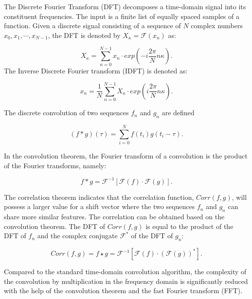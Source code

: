 \documentclass[letterpaper, 10 pt, conference]{ieeeconf}  %
\begin{document}
The Discrete Fourier Transform (DFT) decomposes a time-domain signal into its constituent frequencies. The input is a finite list of equally spaced samples of a function. Given a discrete signal consisting of a sequence of $N$ complex numbers $x_{0},x_{1},\cdots,x_{N-1}$, the DFT is denoted by $X_{\kappa} = \mathcal{F}({x_{n}})$ as:

\begin{equation}\label{equ21}
    X_{\kappa} = \sum_{n=0}^{N-1}x_{n}\cdot exp(-i\frac{2\pi}{N}n\kappa).
\end{equation}
The Inverse Discrete Fourier transform (IDFT) is denoted as:

\begin{equation}\label{equ22}
    x_{n} = \frac{1}{N}\sum_{n=0}^{N-1}X_{\kappa}\cdot exp(i\frac{2\pi}{N}n\kappa).
\end{equation}

The discrete convolution of two sequences $f_{n}$ and $g_{n}$  are defined

\begin{equation}\label{equ23}
    (f \ast g)(\tau)=\sum_{i=0}^{N}f(t_{i})g(t_{i}-\tau).
\end{equation}

In the convolution theorem, the Fourier transform of a convolution is the product of the Fourier transforms, namely:

\begin{equation}\label{equ24}
    f \ast g = \mathcal{F}^{-1} [\mathcal{F}(f) \cdot \mathcal{F}(g)].
\end{equation}
 
The correlation theorem indicates that the correlation function, $Corr(f,g)$, will possess a larger value for a shift vector where the two sequences $f_n$ and $g_n$ can share more similar features. The correlation can be obtained based on the convolution theorem. The DFT of $Corr(f,g)$ is equal to the product of the DFT of $f_{n}$ and the complex conjugate $\mathcal{F}^{*}$ of the DFT of $g_n$:

\begin{equation}\label{equ25}
    Corr(f,g)=f \star g = \mathcal{F}^{-1}[\mathcal{F}(f) \cdot (\mathcal{F}(g))^{*}].
\end{equation}

Compared to the standard time-domain convolution algorithm, the complexity of the convolution by multiplication in the frequency domain is significantly reduced with the help of the convolution theorem and the fast Fourier transform (FFT).
\end{document}
